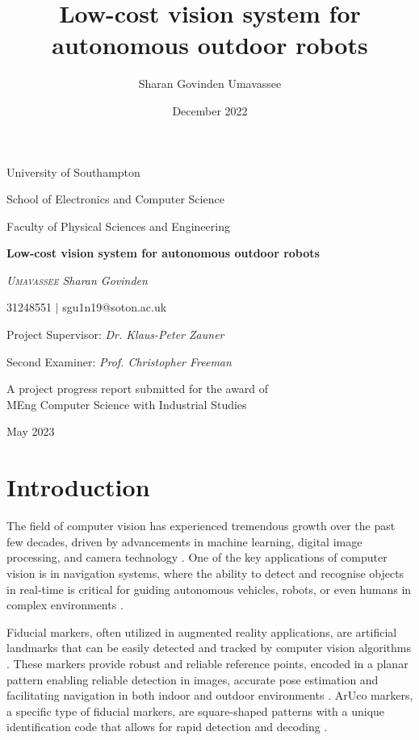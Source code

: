 \documentclass[12pt,a4paper]{report}
\author{Sharan Govinden Umavassee}
\title{Low-cost vision system for autonomous outdoor robots}
\date{December 2022}
\def\aruco{ArUco }
\begin{document}
\begin{titlepage}
\centering
{\Large\textsc University of Southampton\par}
{\Large\textsc School of Electronics and Computer Science\par}
{\Large\textsc Faculty of Physical Sciences and Engineering\par}
\vspace{3cm}
{\huge\bfseries Low-cost vision system for autonomous outdoor robots\par}
\vspace{2.5cm}
{\Large\itshape \textsc{Umavassee} Sharan Govinden\par}
{\Large 31248551 $|$ sgu1n19@soton.ac.uk\par}
\vspace{2cm}
{\Large Project Supervisor: \itshape Dr. Klaus-Peter Zauner\par}
{\Large Second Examiner: \itshape Prof. Christopher Freeman\par}
\vfill
{\large {A project progress report submitted for the award of
\\MEng Computer Science with Industrial Studies}\par}
\vspace{1cm}
{\large May 2023}
\end{titlepage}

\tableofcontents

\clearpage
\listoftables
\listoffigures
\clearpage

\chapter{Introduction}
The field of computer vision has experienced tremendous growth over the past few decades, driven by advancements in machine learning, digital image processing, and camera technology \cite{szeliski2010computer}\cite{lecun2015deep}. One of the key applications of computer vision is in navigation systems, where the ability to detect and recognise objects in real-time is critical for guiding autonomous vehicles, robots, or even humans in complex environments \cite{thrun2005probabilistic}\cite{bonin2008visual}.

Fiducial markers, often utilized in augmented reality applications, are artificial landmarks that can be easily detected and tracked by computer vision algorithms \cite{kato1999marker}. These markers provide robust and reliable reference points, encoded in a planar pattern enabling reliable detection in images, accurate pose estimation and facilitating navigation in both indoor and outdoor environments \cite{garrido2014automatic}. \aruco markers, a specific type of fiducial markers, are square-shaped patterns with a unique identification code that allows for rapid detection and decoding \cite{garrido2016generation}.
\end{document}
